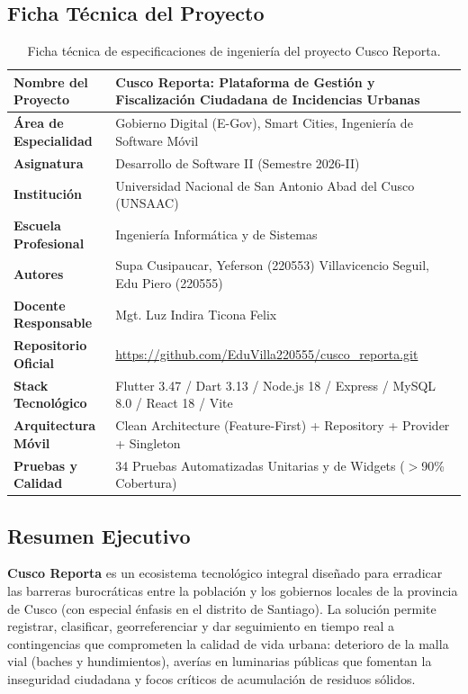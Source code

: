 \documentclass[12pt,a4paper]{article}
\begin{document}
\subsection{Ficha Técnica del Proyecto}
\begin{table}[H]
\centering
\small
\begin{tabularx}{\textwidth}{>{\bfseries\color{unsaacBlue}}p{4.2cm} X}
\toprule
Nombre del Proyecto & Cusco Reporta: Plataforma de Gestión y Fiscalización Ciudadana de Incidencias Urbanas \\
\midrule
Área de Especialidad & Gobierno Digital (E-Gov), Smart Cities, Ingeniería de Software Móvil \\
Asignatura & Desarrollo de Software II (Semestre 2026-II) \\
Institución & Universidad Nacional de San Antonio Abad del Cusco (UNSAAC) \\
Escuela Profesional & Ingeniería Informática y de Sistemas \\
Autores & Supa Cusipaucar, Yeferson (220553) \newline Villavicencio Seguil, Edu Piero (220555) \\
Docente Responsable & Mgt. Luz Indira Ticona Felix \\
Repositorio Oficial & \url{https://github.com/EduVilla220555/cusco_reporta.git} \\
Stack Tecnológico & Flutter 3.47 / Dart 3.13 / Node.js 18 / Express / MySQL 8.0 / React 18 / Vite \\
Arquitectura Móvil & Clean Architecture (Feature-First) + Repository + Provider + Singleton \\
Pruebas y Calidad & 34 Pruebas Automatizadas Unitarias y de Widgets ($>$90\% Cobertura) \\
\bottomrule
\end{tabularx}
\caption{Ficha técnica de especificaciones de ingeniería del proyecto Cusco Reporta.}
\label{tab:ficha_tecnica}
\end{table}

\subsection{Resumen Ejecutivo}
\textbf{Cusco Reporta} es un ecosistema tecnológico integral diseñado para erradicar las barreras burocráticas entre la población y los gobiernos locales de la provincia de Cusco (con especial énfasis en el distrito de Santiago). La solución permite registrar, clasificar, georreferenciar y dar seguimiento en tiempo real a contingencias que comprometen la calidad de vida urbana: deterioro de la malla vial (baches y hundimientos), averías en luminarias públicas que fomentan la inseguridad ciudadana y focos críticos de acumulación de residuos sólidos.
\end{document}
